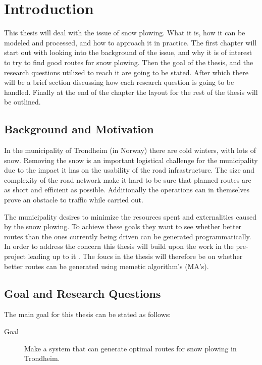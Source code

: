 \chapter{Introduction}
\label{cha:introduction}

This thesis will deal with the issue of snow plowing. What it is, how it can be modeled and processed, and how to approach it in practice. The first chapter will start out with looking into the background of the issue, and why it is of interest to try to find good routes for snow plowing. Then the goal of the thesis, and the research questions utilized to reach it are going to be stated. After which there will be a brief section discussing how each research question is going to be handled. Finally at the end of the chapter the layout for the rest of the thesis will be outlined.

\section{Background and Motivation}

In the municipality of Trondheim (in Norway) there are cold winters, with lots of snow. Removing the snow is an important logistical challenge for the municipality due to the impact it has on the usability of the road infrastructure. The size and complexity of the road network make it hard to be sure that planned routes are as short and efficient as possible. Additionally the operations can in themselves prove an obstacle to traffic while carried out.

The municipality desires to minimize the resources spent and externalities caused by the snow plowing. To achieve these goals they want to see whether better routes than the ones currently being driven can be generated programmatically. In order to address the concern this thesis will build upon the work in the pre-project leading up to it \citep{forprosjektet}. The foucs in the thesis will therefore be on whether better routes can be generated using memetic algorithm's (MA's).

\section{Goal and Research Questions}
\label{sec:goal_and_research_questions}

The main goal for this thesis can be stated as follows:

\begin{description}
    \item [Goal] Make a system that can generate optimal routes for snow plowing in Trondheim.
\end{description}


